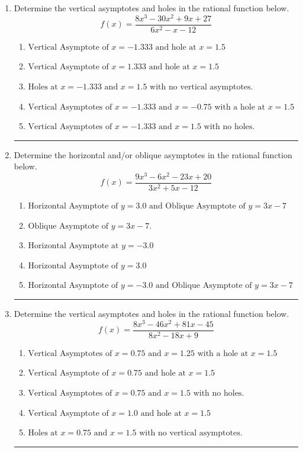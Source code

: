 \documentclass[14pt]{extbook}
\newcommand{\litem}[1]{\item#1\hspace*{-1cm}\rule{\textwidth}{0.4pt}}
\begin{document}
\begin{enumerate}
{\begin{enumerate}[label=\Alph*.]
\end{enumerate} }
\litem{
Determine the vertical asymptotes and holes in the rational function below.\[ f(x) = \frac{8x^{3} -30 x^{2} +9 x + 27}{6x^{2} -x -12} \]\begin{enumerate}[label=\Alph*.]
\item \( \text{Vertical Asymptote of } x = -1.333 \text{ and hole at } x = 1.5 \)
\item \( \text{Vertical Asymptote of } x = 1.333 \text{ and hole at } x = 1.5 \)
\item \( \text{Holes at } x = -1.333 \text{ and } x = 1.5 \text{ with no vertical asymptotes.} \)
\item \( \text{Vertical Asymptotes of } x = -1.333 \text{ and } x = -0.75 \text{ with a hole at } x = 1.5 \)
\item \( \text{Vertical Asymptotes of } x = -1.333 \text{ and } x = 1.5 \text{ with no holes.} \)

\end{enumerate} }
\litem{
Determine the horizontal and/or oblique asymptotes in the rational function below.\[ f(x) = \frac{9x^{3} -6 x^{2} -23 x + 20}{3x^{2} +5 x -12} \]\begin{enumerate}[label=\Alph*.]
\item \( \text{Horizontal Asymptote of } y = 3.0 \text{ and Oblique Asymptote of } y = 3x -7 \)
\item \( \text{Oblique Asymptote of } y = 3x -7. \)
\item \( \text{Horizontal Asymptote at } y = -3.0 \)
\item \( \text{Horizontal Asymptote of } y = 3.0  \)
\item \( \text{Horizontal Asymptote of } y = -3.0 \text{ and Oblique Asymptote of } y = 3x -7 \)

\end{enumerate} }
\litem{
Determine the vertical asymptotes and holes in the rational function below.\[ f(x) = \frac{8x^{3} -46 x^{2} +81 x -45}{8x^{2} -18 x + 9} \]\begin{enumerate}[label=\Alph*.]
\item \( \text{Vertical Asymptotes of } x = 0.75 \text{ and } x = 1.25 \text{ with a hole at } x = 1.5 \)
\item \( \text{Vertical Asymptote of } x = 0.75 \text{ and hole at } x = 1.5 \)
\item \( \text{Vertical Asymptotes of } x = 0.75 \text{ and } x = 1.5 \text{ with no holes.} \)
\item \( \text{Vertical Asymptote of } x = 1.0 \text{ and hole at } x = 1.5 \)
\item \( \text{Holes at } x = 0.75 \text{ and } x = 1.5 \text{ with no vertical asymptotes.} \)


\end{enumerate}}
\end{enumerate}
\end{document}
